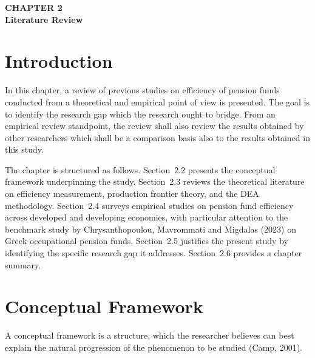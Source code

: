 \documentclass[12pt,a4paper]{article}
\begin{document}
\newpage

\begin{center}
    {\LARGE\bfseries CHAPTER 2}\\[0.5cm]
    {\Large\bfseries Literature Review}
\end{center}
\setcounter{section}{0}
\renewcommand{\thesection}{2.\arabic{section}}
{}

\vspace{1cm}

\section{Introduction}

In this chapter, a review of previous studies on efficiency of pension funds conducted from a theoretical and empirical point of view is presented. The goal is to identify the research gap which the research ought to bridge. From an empirical review standpoint, the review shall also review the results obtained by other researchers which shall be a comparison basis also to the results obtained in this study.

The chapter is structured as follows. Section~2.2 presents the conceptual framework underpinning the study. Section~2.3 reviews the theoretical literature on efficiency measurement, production frontier theory, and the DEA methodology. Section~2.4 surveys empirical studies on pension fund efficiency across developed and developing economies, with particular attention to the benchmark study by Chrysanthopoulou, Mavrommati and Migdalas (2023) on Greek occupational pension funds. Section~2.5 justifies the present study by identifying the specific research gap it addresses. Section~2.6 provides a chapter summary.

\section{Conceptual Framework}

A conceptual framework is a structure, which the researcher believes can best explain the natural progression of the phenomenon to be studied (Camp, 2001).
\end{document}
